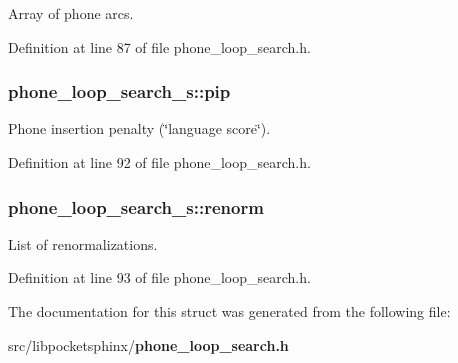 \-Array of phone arcs. 



\-Definition at line 87 of file phone\-\_\-loop\-\_\-search.\-h.

\subsubsection[{pip}]{ {\bf phone\-\_\-loop\-\_\-search\-\_\-s\-::pip}}\label{structphone__loop__search__s_ac979bc57a659c7853eec1854dbcbfabe}


\-Phone insertion penalty (\char`\"{}language score\char`\"{}). 



\-Definition at line 92 of file phone\-\_\-loop\-\_\-search.\-h.

\subsubsection[{renorm}]{ {\bf phone\-\_\-loop\-\_\-search\-\_\-s\-::renorm}}\label{structphone__loop__search__s_a273295fbe1a22ad3ddf7db8695a394ec}


\-List of renormalizations. 



\-Definition at line 93 of file phone\-\_\-loop\-\_\-search.\-h.



\-The documentation for this struct was generated from the following file\-:\begin{DoxyCompactItemize}
\item 
src/libpocketsphinx/{\bf phone\-\_\-loop\-\_\-search.\-h}\end{DoxyCompactItemize}
